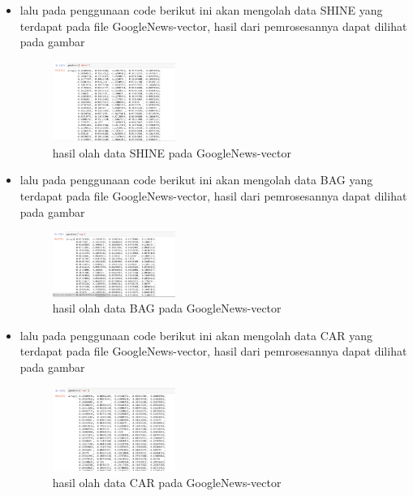 \begin{enumerate}
\begin{itemize}
        \item  lalu pada penggunaan code berikut ini akan mengolah data SHINE yang terdapat pada file GoogleNews-vector, hasil dari pemrosesannya dapat dilihat pada gambar
        \begin{figure}[H]
            \includegraphics[width=4cm]{figures/1174096/tugas5/praktek1-7.PNG}
            \centering
            \caption{hasil olah data SHINE pada GoogleNews-vector}
        \end{figure}
        
        \item  lalu pada penggunaan code berikut ini akan mengolah data BAG yang terdapat pada file GoogleNews-vector, hasil dari pemrosesannya dapat dilihat pada gambar
        \begin{figure}[H]
            \includegraphics[width=4cm]{figures/1174096/tugas5/praktek1-8.PNG}
            \centering
            \caption{hasil olah data BAG pada GoogleNews-vector}
        \end{figure}
        
        \item  lalu pada penggunaan code berikut ini akan mengolah data CAR yang terdapat pada file GoogleNews-vector, hasil dari pemrosesannya dapat dilihat pada gambar
        \begin{figure}[H]
            \includegraphics[width=4cm]{figures/1174096/tugas5/praktek1-9.PNG}
            \centering
            \caption{hasil olah data CAR pada GoogleNews-vector}
        \end{figure}
        

\end{itemize}
\end{enumerate}

